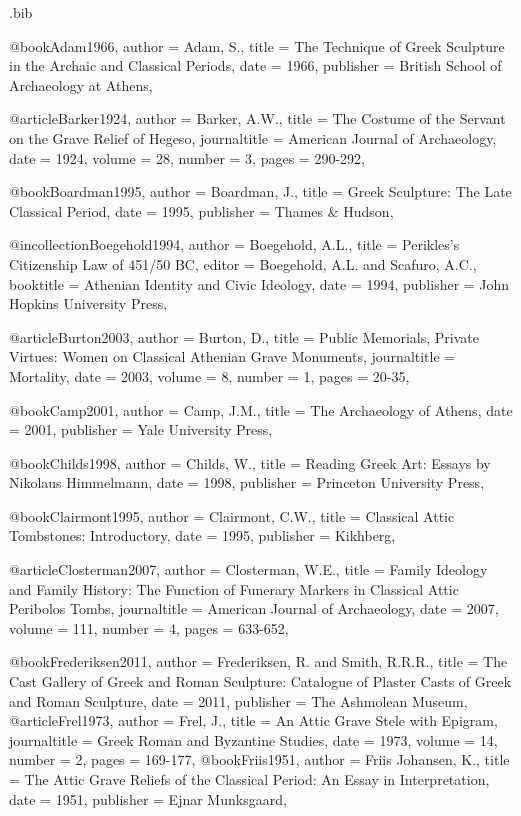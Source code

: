 \begin{filecontents}{\IJSRAidentifier.bib}

	@book{Adam1966,
		author = {Adam, S.},
		title = {The Technique of Greek Sculpture in the Archaic and Classical Periods},
		date = {1966},
		publisher = {British School of Archaeology at Athens},
	}

	@article{Barker1924,
		author = {Barker, A.W.},
		title = {The Costume of the Servant on the Grave Relief of Hegeso},
		journaltitle = {American Journal of Archaeology},
		date = {1924},
		volume = {28},
		number = {3},
		pages = {290-292},
	}

	@book{Boardman1995,
		author = {Boardman, J.},
		title = {Greek Sculpture: The Late Classical Period},
		date = {1995},
		publisher = {Thames \& Hudson},
	}

	@incollection{Boegehold1994,
		author = {Boegehold, A.L.},
		title = {Perikles’s Citizenship Law of 451/50 BC},
		editor = {Boegehold, A.L. and Scafuro, A.C.},
		booktitle = {Athenian Identity and Civic Ideology},
		date = {1994},
		publisher = {John Hopkins University Press},
	}

	@article{Burton2003,
		author = {Burton, D.},
		title = {Public Memorials, Private Virtues: Women on Classical Athenian Grave Monuments},
		journaltitle = {Mortality},
		date = {2003},
		volume = {8},
		number = {1},
		pages = {20-35},
	}

	@book{Camp2001,
		author = {Camp, J.M.},
		title = {The Archaeology of Athens},
		date = {2001},
		publisher = {Yale University Press},
	}

	@book{Childs1998,
		author = {Childs, W.},
		title = {Reading Greek Art: Essays by Nikolaus Himmelmann},
		date = {1998},
		publisher = {Princeton University Press},
	}

	@book{Clairmont1995,
		author = {Clairmont, C.W.},
		title = {Classical Attic Tombstones: Introductory},
		date = {1995},
		publisher = {Kikhberg},
	}

	@article{Closterman2007,
		author = {Closterman, W.E.},
		title = {Family Ideology and Family History: The Function of Funerary Markers in Classical Attic Peribolos Tombs},
		journaltitle = {American Journal of Archaeology},
		date = {2007},
		volume = {111},
		number = {4},
		pages = {633-652},
	}

	@book{Frederiksen2011,
		author = {Frederiksen, R. and Smith, R.R.R.},
		title = {The Cast Gallery of Greek and Roman Sculpture: Catalogue of Plaster Casts of Greek and Roman Sculpture},
		date = {2011},
		publisher = {The Ashmolean Museum},
	}
	@article{Frel1973,
	author = {Frel, J.},
	title = {An Attic Grave Stele with Epigram},
	journaltitle = {Greek Roman and Byzantine Studies},
	date = {1973},
	volume = {14},
	number = {2},
	pages = {169-177},
}
	@book{Friis1951,
		author = {Friis Johansen, K.},
		title = {The Attic Grave Reliefs of the Classical Period: An Essay in Interpretation},
		date = {1951},
		publisher = {Ejnar Munksgaard},
	}


\end{filecontents}
